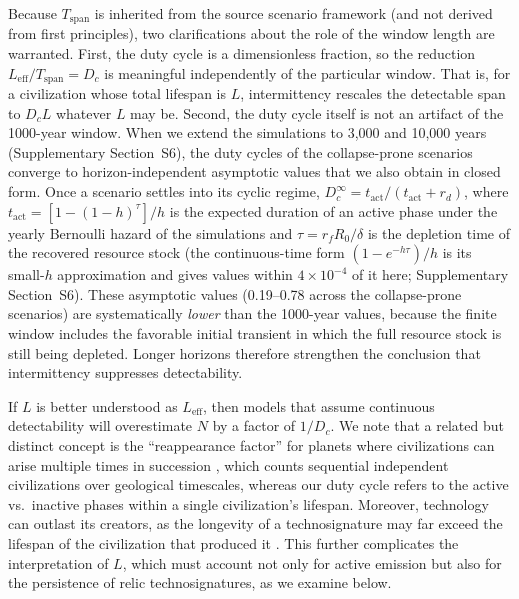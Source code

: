 Because $T_{\mathrm{span}}$ is inherited from the source scenario framework (and not derived from first principles), two clarifications about the role of the window length are warranted. First, the duty cycle is a dimensionless fraction, so the reduction $L_{\mathrm{eff}}/T_{\mathrm{span}} = D_c$ is meaningful independently of the particular window. That is, for a civilization whose total lifespan is $L$, intermittency rescales the detectable span to $D_c L$ whatever $L$ may be. Second, the duty cycle itself is not an artifact of the 1000-year window. When we extend the simulations to 3,000 and 10,000 years (Supplementary Section~S6), the duty cycles of the collapse-prone scenarios converge to horizon-independent asymptotic values that we also obtain in closed form. Once a scenario settles into its cyclic regime, $D_c^{\infty} = t_{\mathrm{act}} / (t_{\mathrm{act}} + r_d)$, where $t_{\mathrm{act}} = [1 - (1-h)^{\tau}]/h$ is the expected duration of an active phase under the yearly Bernoulli hazard of the simulations and $\tau = r_f R_0 / \delta$ is the depletion time of the recovered resource stock (the continuous-time form $(1 - e^{-h\tau})/h$ is its small-$h$ approximation and gives values within $4\times10^{-4}$ of it here; Supplementary Section~S6). These asymptotic values (0.19--0.78 across the collapse-prone scenarios) are systematically \emph{lower} than the 1000-year values, because the finite window includes the favorable initial transient in which the full resource stock is still being depleted. Longer horizons therefore strengthen the conclusion that intermittency suppresses detectability.

If $L$ is better understood as $L_{\mathrm{eff}}$, then models that assume continuous detectability will overestimate $N$ by a factor of $1/D_c$. We note that a related but distinct concept is the ``reappearance factor'' for planets where civilizations can arise multiple times in succession \citep{Bhattacharya2011-qr}, which counts sequential independent civilizations over geological timescales, whereas our duty cycle refers to the active vs.\ inactive phases within a single civilization's lifespan. Moreover, technology can outlast its creators, as the longevity of a technosignature may far exceed the lifespan of the civilization that produced it \citep{Wright2022-wh,Cirkovic2019-oq}. This further complicates the interpretation of $L$, which must account not only for active emission but also for the persistence of relic technosignatures, as we examine below.

